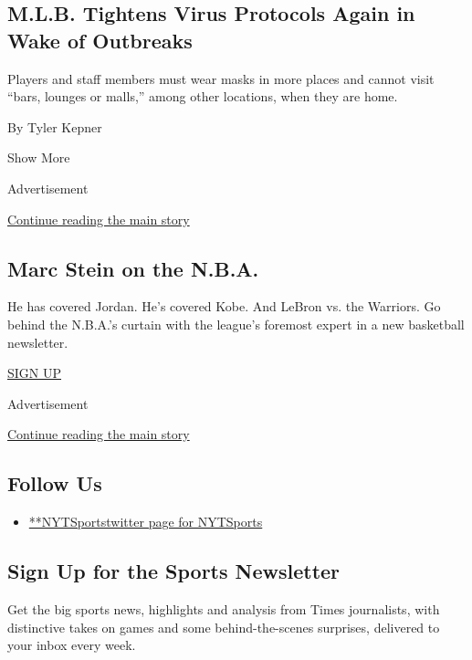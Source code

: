 \begin{enumerate}
  \hypertarget{mlb-tightens-virus-protocols-again-in-wake-of-outbreaks}{%
  \subsection{M.L.B. Tightens Virus Protocols Again in Wake of
  Outbreaks}\label{mlb-tightens-virus-protocols-again-in-wake-of-outbreaks}}

  Players and staff members must wear masks in more places and cannot
  visit ``bars, lounges or malls,'' among other locations, when they are
  home.

  By Tyler Kepner
\end{enumerate}

Show More

Advertisement

\protect\hyperlink{after-mid2}{Continue reading the main story}

\hypertarget{marc-stein-on-the-nba}{%
\subsection{Marc Stein on the N.B.A.}\label{marc-stein-on-the-nba}}

He has covered Jordan. He's covered Kobe. And LeBron vs. the Warriors.
Go behind the N.B.A.'s curtain with the league's foremost expert in a
new basketball newsletter.

\href{/newsletters/signup/MSB}{SIGN UP}

Advertisement

\protect\hyperlink{after-mktg}{Continue reading the main story}

\hypertarget{follow-us}{%
\subsection{Follow Us}\label{follow-us}}

\begin{itemize}
\tightlist
\item
  \href{https://twitter.com/NYTSports}{**NYTSportstwitter page for
  NYTSports}
\end{itemize}

\hypertarget{sign-up-for-the-sports-newsletter}{%
\subsection{Sign Up for the Sports
Newsletter}\label{sign-up-for-the-sports-newsletter}}

Get the big sports news, highlights and analysis from Times journalists,
with distinctive takes on games and some behind-the-scenes surprises,
delivered to your inbox every week.

